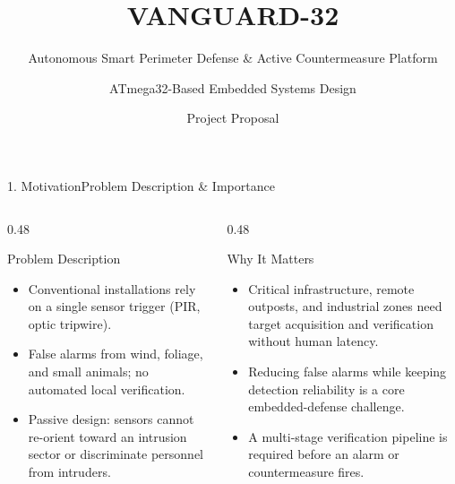 \documentclass[aspectratio=169, 10pt]{beamer}
\title{VANGUARD-32}
\subtitle{Autonomous Smart Perimeter Defense \& Active Countermeasure Platform}
\author{ATmega32-Based Embedded Systems Design}
\date{Project Proposal}
\begin{document}
\begin{frame}
    \titlepage
\end{frame}

\begin{frame}{1. Motivation}{Problem Description \& Importance}
    \begin{columns}[T]
        \begin{column}{0.48\textwidth}
            \begin{block}{Problem Description}
                \small
                \begin{itemize}
                    \item Conventional installations rely on a single sensor trigger (PIR, optic tripwire).
                    \item False alarms from wind, foliage, and small animals; no automated local verification.
                    \item Passive design: sensors cannot re-orient toward an intrusion sector or discriminate personnel from intruders.
                \end{itemize}
            \end{block}
        \end{column}
        \begin{column}{0.48\textwidth}
            \begin{block}{Why It Matters}
                \small
                \begin{itemize}
                    \item Critical infrastructure, remote outposts, and industrial zones need target acquisition and verification without human latency.
                    \item Reducing false alarms while keeping detection reliability is a core embedded-defense challenge.
                    \item A multi-stage verification pipeline is required before an alarm or countermeasure fires.
                \end{itemize}
            \end{block}
        \end{column}
    \end{columns}
\end{frame}
\end{document}
